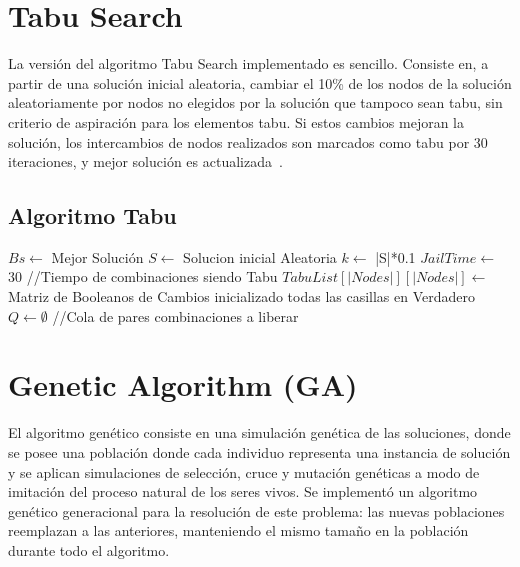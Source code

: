 \documentclass{ci5652}
\begin{document}
\section{Tabu Search}
La versión del algoritmo Tabu Search implementado es sencillo. Consiste en, a partir de una solución inicial aleatoria, cambiar el 10\% de los nodos de la solución aleatoriamente por nodos no elegidos por la solución que tampoco sean tabu, sin criterio de aspiración para los elementos tabu. Si estos cambios mejoran la solución, los intercambios de nodos realizados son marcados como tabu por 30 iteraciones, y mejor solución es actualizada~\cite{fgtabu}.

\subsection{Algoritmo Tabu}
\begin{algorithm}
\DontPrintSemicolon
$Bs\leftarrow$ Mejor Solución\;
$S \leftarrow$ Solucion inicial Aleatoria\;
$k \leftarrow$ |S|*0.1\;
$JailTime \leftarrow$ 30 //Tiempo de combinaciones siendo Tabu\;
$TabuList[|Nodes|][|Nodes|] \leftarrow$ Matriz de Booleanos de Cambios inicializado todas las casillas en Verdadero\;
$Q \leftarrow \emptyset$ //Cola de pares combinaciones a liberar\;
\end{algorithm}

\section{Genetic Algorithm (GA)}
El algoritmo genético consiste en una simulación genética de las soluciones, donde se posee una población donde cada individuo representa una instancia de solución y se aplican simulaciones de selección, cruce y mutación genéticas a modo de imitación del proceso natural de los seres vivos. Se implementó un algoritmo genético generacional para la resolución de este problema: las nuevas poblaciones reemplazan a las anteriores, manteniendo el mismo tamaño en la población durante todo el algoritmo.
\end{document}
